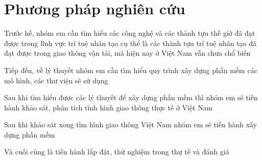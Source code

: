 \documentclass[12pt,twoside,a4paper]{article}
\begin{document}
\section{Phương pháp nghiên cứu}
Trước hế, nhóm em cần tìm hiểu các công nghệ và các thành tựu thế giớ đã đạt được trong lĩnh vực trí tuệ nhân tạo cụ thể là các thành tựu trí tuệ nhân tạo đã đạt được trong giao thông vận tải, mà hiện nay ở Việt Nam vẫn chưa chổ biến
\par
Tiếp đến, về lý thuyết nhóm em cần tìm hiểu quy trình xây dựng phần mềm các mô hình, các thư viện sẽ sử dụng
\par
Sau khi tìm hiểu được các lý thuyết để xây dựng phần mềm thì nhóm em sẽ tiến hành khảo sát, phân tích tình hình giao thông thực tế ở Việt Nam
\par
Sau khi khảo sát xong tìm hình giao thông Việt Nam nhóm em sẽ tiến hành xây dựng phần mềm
\par
Và cuối cùng là tiến hành lắp đặt, thử nghiệm trong thự tế và đánh giá
\end{document}
